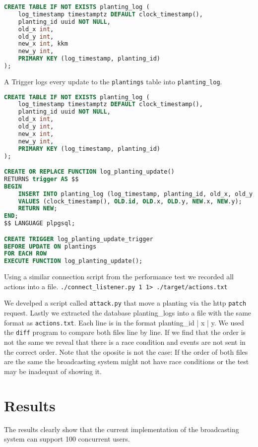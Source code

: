 \documentclass[final,draft]{vutinfth} %
\begin{document}
\begin{lstlisting}[language=sql]
CREATE TABLE IF NOT EXISTS planting_log (
    log_timestamp timestamptz DEFAULT clock_timestamp(),
    planting_id uuid NOT NULL,
    old_x int,
    old_y int,
    new_x int, kkm
    new_y int,
    PRIMARY KEY (log_timestamp, planting_id)
);
\end{lstlisting}

A Trigger logs every update to the \texttt{plantings} table into \texttt{planting\_log}.

\begin{lstlisting}[language=sql]
CREATE TABLE IF NOT EXISTS planting_log (
    log_timestamp timestamptz DEFAULT clock_timestamp(),
    planting_id uuid NOT NULL,
    old_x int,
    old_y int,
    new_x int,
    new_y int,
    PRIMARY KEY (log_timestamp, planting_id)
);

CREATE OR REPLACE FUNCTION log_planting_update()
RETURNS trigger AS $$
BEGIN
    INSERT INTO planting_log (log_timestamp, planting_id, old_x, old_y, new_x, new_y)
    VALUES (clock_timestamp(), OLD.id, OLD.x, OLD.y, NEW.x, NEW.y);
    RETURN NEW;
END;
$$ LANGUAGE plpgsql;

CREATE TRIGGER log_planting_update_trigger
BEFORE UPDATE ON plantings
FOR EACH ROW
EXECUTE FUNCTION log_planting_update();
\end{lstlisting}

Using a similar connection script from the performance test we recorded all actions into a file. \texttt{./connect\_listener.py 1 1> ./target/actions.txt}

We develped a script called \texttt{attack.py} that move a planting via the \gls{http} \texttt{patch} request.
Lastly we extracted the database planting\_logs into a file with the same format as \texttt{actions.txt}.
Each line is in the format planting\_id | x | y.
We used the \texttt{diff} program to compare both files line by line.
If we find that the order is not the same we reveal that there is a race condition and events are not sent in the correct order. 
Note that the oposite is not the case: If the order of both files are the same the broadcasting system might not have race conditions or the test may be inadequat of showing it.

\chapter{Results}

The results clearly show that the current implementation of the broadcasting system can support 100 concurrent users.
\end{document}
